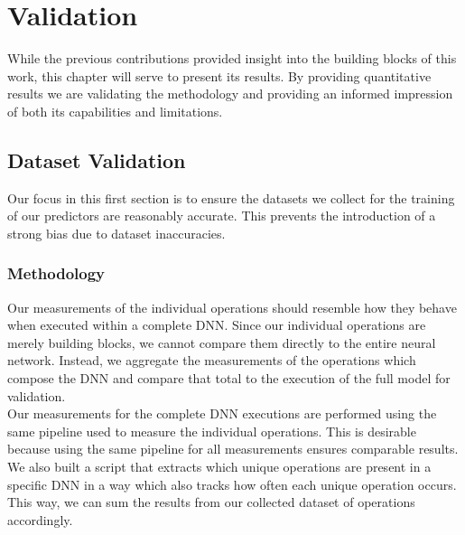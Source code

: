\chapter{Validation}\label{chap:contrib3}

While the previous contributions provided insight into the building blocks of this work, this chapter will serve to present its results. By providing quantitative results we are validating the methodology and providing an informed impression of both its capabilities and limitations. 


\section{Dataset Validation}
Our focus in this first section is to ensure the datasets we collect for the training of our predictors are reasonably accurate. This prevents the introduction of a strong bias due to dataset inaccuracies.


\subsection{Methodology}
Our measurements of the individual operations should resemble how they behave when executed within a complete DNN. Since our individual operations are merely 
building blocks, we cannot compare them directly to the entire neural network. Instead, we aggregate the measurements of the operations which compose the DNN and compare that total to the execution of the full model for validation. \\
Our measurements for the complete DNN executions are performed using the same pipeline used to measure the individual operations. This is desirable because using the same pipeline for all measurements ensures comparable results. \\
We also built a script that extracts which unique operations are present in a specific DNN in a way which also tracks how often each unique operation occurs. This way, we can sum the results from our collected dataset of operations accordingly.



